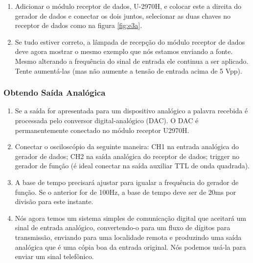             \begin{enumerate}
                \item Adicionar o módulo receptor de dados, U-2970H, e colocar este a direita do gerador de dados e conectar os dois juntos, selecionar as duas chaves no receptor de dados como na figura \ref{fig:e3a}.
                
                \item Se tudo estiver correto, a lâmpada de recepção do módulo receptor de dados deve agora mostrar o mesmo exemplo que nós estamos enviando a fonte. Mesmo alterando a frequência do sinal de entrada ele continua a ser aplicado. Tente aumentá-las (mas não aumente a tensão de entrada acima de 5 Vpp).
            \end{enumerate}
            
         \subsubsection{Obtendo Saída Analógica}
         
            \begin{enumerate}
                \item Se a saída for apresentada para um dispositivo analógico a palavra recebida é processada pelo conversor digital-analógico (DAC). O DAC é permanentemente conectado no módulo receptor U2970H.   
                
                \item Conectar o osciloscópio da seguinte maneira: CH1 na entrada analógica do gerador de dados; CH2 na saída analógica do receptor de dados; trigger no gerador de função (é ideal conectar na saída auxiliar TTL de onda quadrada).
                
                \item A base de tempo precisará ajustar para igualar a frequência do gerador de função. Se o anterior for de 100Hz, a base de tempo deve ser de 20ms por divisão para este instante.
                
                \item Nós agora temos um sistema simples de comunicação digital que aceitará um sinal de entrada analógico, convertendo-o para um fluxo de dígitos para transmissão, enviando para uma localidade remota e produzindo uma saída analógica que é uma cópia boa da entrada original. Nós podemos usá-la para enviar um sinal telefônico.
            \end{enumerate}
            
